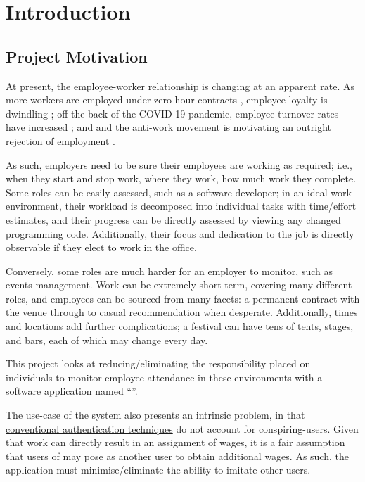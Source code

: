 \chapter{Introduction}

\section{Project Motivation} \label{s:motivation}

At present, the employee-worker relationship is changing at
an apparent rate.
As more workers are employed under zero-hour contracts
\parencite{zeroHourContractsStats}, employee loyalty is
dwindling \parencite{zeroHourContractsLoyalty}; off the
back of the COVID-19 pandemic, employee turnover rates have
increased \parencite{employeeTurnover}; and and the
anti-work movement is motivating an outright rejection of
employment \parencite{antiWorkMovement}.

As such, employers need to be sure their employees are
working as required; i.e., when they start and stop work,
where they work, how much work they complete.
Some roles can be easily assessed, such as a software
developer; in an ideal work environment, their workload is
decomposed into individual tasks with time/effort
estimates, and their progress can be directly assessed by
viewing any changed programming code.
Additionally, their focus and dedication to the job is
directly observable if they elect to work in the office.

Conversely, some roles are much harder for an employer to
monitor, such as events management.
Work can be extremely short-term, covering many different
roles, and employees can be sourced from many facets: a
permanent contract with the venue through to casual
recommendation when desperate.
Additionally, times and locations add further
complications; a festival can have tens of tents, stages,
and bars, each of which may change every day.

This project looks at reducing/eliminating the
responsibility placed on individuals to monitor employee
attendance in these environments with a software
application named \enquote{\projectname}.

The use-case of the system also presents an intrinsic
problem, in that \hyperref[s:userAuth]{conventional
  authentication techniques} do not account for
\gls{conspiring-users}.
Given that  work can
directly result in an assignment of wages, it is a fair
assumption that users of \projectname{} may pose as another
user to obtain additional wages.
As such, the application must minimise/eliminate the
ability to imitate other users.

